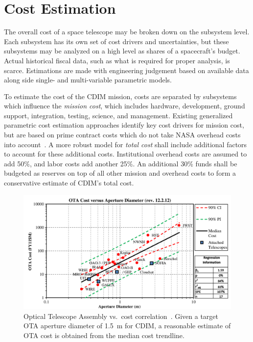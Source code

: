 \documentclass{ws-jai}
\begin{document}
\section{Cost Estimation}
\label{sec:cost}
The overall cost of a space telescope may be broken down on the subsystem level.
Each subsystem has its own set of cost drivers and uncertainties, but these subsystems may be analyzed on a high level as shares of a spacecraft's budget.
Actual historical fiscal data, such as what is required for proper analysis, is scarce.
Estimations are made with engineering judgement based on available data along side single- and multi-variable parametric models.

To estimate the cost of the CDIM mission, costs are separated by subsystems which influence the \emph{mission cost}, which includes hardware, development, ground support, integration, testing, science, and management.
Existing generalized parametric cost estimation approaches identify key cost drivers for mission cost, but are based on prime contract costs which do not take NASA overhead costs into account~\cite{stahl2013,bely2011}.
A more robust model for \emph{total cost} shall include additional factors to account for these additional costs.
Institutional overhead costs are assumed to add 50\%, and labor costs add another 25\%.
An additional 30\% funds shall be budgeted as reserves on top of all other mission and overhead costs to form a conservative estimate of CDIM's total cost.

\begin{figure}[!htp]
    \centering
    \includegraphics[width=.8\linewidth]{figs/ota_cost-diameter_stahl2010.png}
    \caption{Optical Telescope Assembly vs.\ cost correlation~\cite{stahl2013}. Given a target OTA aperture diameter of \SI{1.5}{\meter} for CDIM, a reasonable estimate of OTA cost is obtained from the median cost trendline.
\label{fig:cost-stahl-ota-cost-vs-diameter}
}
\end{figure}
\end{document}
